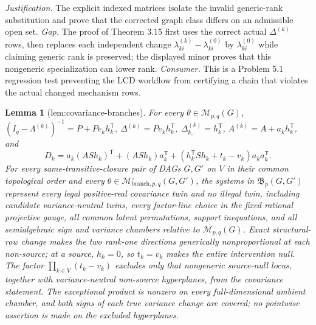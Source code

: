 \documentclass{article}
\newtheorem{lemma}{Lemma}
\begin{document}
\par\smallskip\noindent \textit{Justification.} The explicit indexed matrices isolate the invalid generic-rank substitution and prove that the corrected graph class differs on an admissible open set. \textit{Gap.} The proof of Theorem 3.15 first uses the correct actual \(\Delta^{(k)}\) rows, then replaces each independent change \(\lambda^{(k)}_{ki}-\lambda^{(0)}_{ki}\) by \(\lambda^{(0)}_{ki}\) while claiming generic rank is preserved; the displayed minor proves that this nongeneric specialization can lower rank. \textit{Consumer.} This is a Problem 5.1 regression test preventing the LCD workflow from certifying a chain that violates the actual changed mechanism rows.

\begin{lemma}[lem:covariance-branches]\label{lem:covariance-branches}
For every \(\theta\in\mathcal M_{p,q}(G)\), \((I_q-\Lambda^{(k)})^{-1}=P+Pe_kh_k^{\mathsf T}\), \(\Delta^{(k)}=Pe_kh_k^{\mathsf T}\), \(\Delta^{(k)}_{k,\cdot}=h_k^{\mathsf T}\), \(A^{(k)}=A+a_kh_k^{\mathsf T}\), and \[D_k=a_k(ASh_k)^{\mathsf T}+(ASh_k)a_k^{\mathsf T}+(h_k^{\mathsf T}Sh_k+t_k-v_k)a_ka_k^{\mathsf T}.\] For every same-transitive-closure pair of DAGs \(G,G'\) on \(V\) in their common topological order and every \(\theta\in\mathcal M^{\circ}_{\mathrm{branch},p,q}(G,G')\), the systems in \(\mathfrak B_p(G,G')\) represent every legal positive-real covariance twin and no illegal twin, including candidate variance-neutral twins, every factor-line choice in the fixed rational projective gauge, all common latent permutations, support inequations, and all semialgebraic sign and variance chambers relative to \(\mathcal M_{p,q}(G)\). Exact structural-row change makes the two rank-one directions generically nonproportional at each non-source; at a source, \(h_k=0\), so \(t_k=v_k\) makes the entire intervention null. The factor \(\prod_{k\in V}(t_k-v_k)\) excludes only that nongeneric source-null locus, together with variance-neutral non-source hyperplanes, from the covariance statement. The exceptional product is nonzero on every full-dimensional ambient chamber, and both signs of each true variance change are covered; no pointwise assertion is made on the excluded hyperplanes.
\end{lemma}
\end{document}

